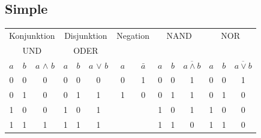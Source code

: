 \documentclass[12pt, a4paper, twopage]{scrartcl}
\begin{document}
\subsection{Simple}
\begin{center}
\begin{tabular}[c]{c | c | c || c| c | c || c | c || c | c | c || c| c| c}
\multicolumn{3}{c||}{Konjunktion}	&	\multicolumn{3}{c||}{Disjunktion} & \multicolumn{2}{c||}{Negation} & \multicolumn{3}{c||}{NAND} & \multicolumn{3}{c}{NOR}\\
\multicolumn{3}{c||}{UND}	&	\multicolumn{3}{c||}{ODER} & \multicolumn{2}{c||}{} & \multicolumn{3}{c||}{} & \multicolumn{3}{c}{}\\
\hline
$a$ & $b$ & $a$ $\wedge$ $b$ & $a$ & $b$ & $a$ $\vee$ $b$ & $a$ & $\bar{a}$ & $a$ & $b$ & $\overline{a \wedge b}$ & $a$ & $b$ & $\overline{a \vee b}$\\
\hline
0 & 0 & 0 & 0 & 0 & 0 & 0 & 1 & 0 & 0 & 1 & 0 & 0 & 1\\
0 & 1 & 0 & 0 & 1 & 1 & 1 & 0 & 0 & 1 & 1 & 0 & 1 & 0\\
1 & 0 & 0 & 1 & 0 & 1 & & & 1 & 0 & 1 & 1 & 0 & 0\\
1 & 1 & 1 & 1 & 1 & 1 & & & 1 & 1 & 0 & 1 & 1 & 0\\
\hline
\end{tabular}
\end{center}








\end{document}
